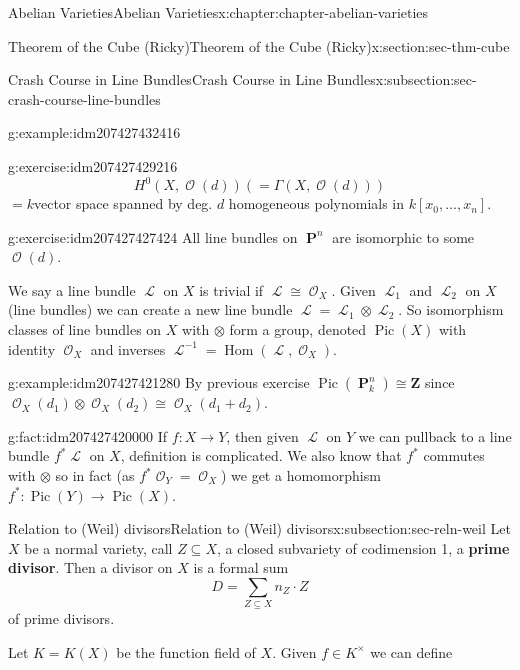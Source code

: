 \documentclass[oneside,10pt,]{book}
\newcommand{\terminology}[1]{\textbf{#1}}
\numberwithin{equation}{section}
\newcommand{\sheaf}[1]{\operatorname{\mathcal{#1}}}
\newcommand{\ZZ}{\mathbf{Z}}
\DeclareMathOperator{\Hom}{Hom}
\DeclareMathOperator{\Pic}{Pic}
\DeclareMathOperator{\PP}{\mathbf{P}}
\begin{document}
\begin{chapterptx}{Abelian Varieties}{}{Abelian Varieties}{}{}{x:chapter:chapter-abelian-varieties}
\begin{sectionptx}{Theorem of the Cube (Ricky)}{}{Theorem of the Cube (Ricky)}{}{}{x:section:sec-thm-cube}
\begin{subsectionptx}{Crash Course in Line Bundles}{}{Crash Course in Line Bundles}{}{}{x:subsection:sec-crash-course-line-bundles}
\begin{example}{}{g:example:idm207427432416}
\end{example}
\begin{inlineexercise}{}{g:exercise:idm207427429216}%
%
\begin{equation*}
H^0(X,\sheaf O(d)) ( = \Gamma (X,\sheaf O(d)))
\end{equation*}
\(= k\)vector space spanned by deg. \(d\) homogeneous polynomials in \(k[x_0,\ldots, x_n]\).%
\end{inlineexercise}
\begin{inlineexercise}{}{g:exercise:idm207427427424}%
All line bundles on \(\PP^n\) are isomorphic to some \(\sheaf O(d)\).%
\end{inlineexercise}
We say a line bundle \(\sheaf L\) on \(X\) is trivial if \(\sheaf L \cong \sheaf O_X\). Given \(\sheaf L_1\) and \(\sheaf L_2\) on \(X\) (line bundles) we can create a new line bundle \(\sheaf L = \sheaf L_1 \otimes \sheaf L_2\). So isomorphism classes of line bundles on \(X\) with \(\otimes\) form a group, denoted \(\Pic(X)\) with identity \(\sheaf O_X\) and inverses \(\sheaf L^{-1} = \Hom(\sheaf L , \sheaf O_X)\).%
\begin{example}{}{g:example:idm207427421280}%
By previous exercise \(\Pic(\PP_k^n) \cong \ZZ\) since \(\sheaf O_X(d_1) \otimes \sheaf O_X(d_2)  \cong \sheaf O_X(d_1+d_2)\).%
\end{example}
\begin{fact}{}{}{g:fact:idm207427420000}%
If \(f\colon X \to Y\), then given \(\sheaf L\) on \(Y\) we can pullback to a line bundle \(f^* \sheaf L\) on \(X\), definition is complicated. We also know that \(f^*\) commutes with \(\otimes\) so in fact (as \(f^*\sheaf O_Y = \sheaf O_X\)) we get a homomorphism \(f^* \colon \Pic(Y) \to \Pic(X)\).%
\end{fact}
\end{subsectionptx}
%
%
\typeout{************************************************}
\typeout{************************************************}
%
\begin{subsectionptx}{Relation to (Weil) divisors}{}{Relation to (Weil) divisors}{}{}{x:subsection:sec-reln-weil}
Let \(X\) be a normal variety, call \(Z\subseteq X\), a closed subvariety of codimension 1, a \terminology{prime divisor}. Then a divisor on \(X\) is a formal sum%
\begin{equation*}
D = \sum_{Z\subseteq X} n_Z\cdot Z
\end{equation*}
of prime divisors.%
\par
Let \(K = K(X)\) be the function field of \(X\). Given \(f\in K^\times\) we can define%

\end{subsectionptx}
\end{sectionptx}
\end{chapterptx}
\end{document}
